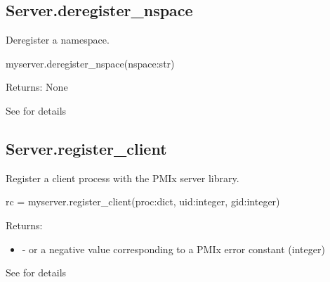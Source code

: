 \subsection{Server.deregister_nspace}

\summary Deregister a namespace.

\format

\pyspecificstart
\begin{codepar}
myserver.deregister_nspace(nspace:str)
\end{codepar}
\pyspecificend


\begin{arglist}
\end{arglist}

Returns: None


See  for details


\subsection{Server.register_client}

\summary
Register a client process with the PMIx server library.


\format

\pyspecificstart
\begin{codepar}
rc = myserver.register_client(proc:dict, uid:integer, gid:integer)
\end{codepar}
\pyspecificend


\begin{arglist}
\end{arglist}

Returns:

\begin{itemize}
    \item {} -  or a negative value corresponding to a PMIx error constant (integer)
\end{itemize}


See  for details


